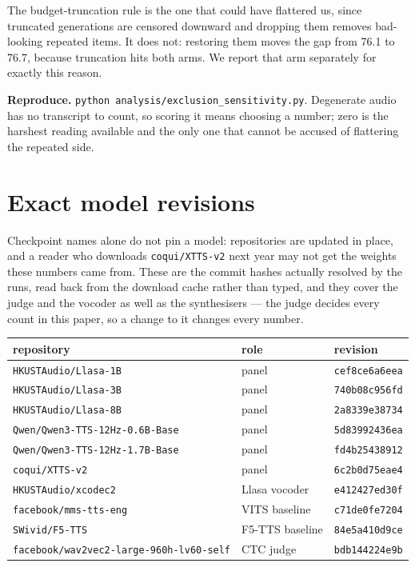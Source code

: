 \documentclass[11pt]{article}
\begin{document}
The budget-truncation rule is the one that could have flattered us, since
truncated generations are censored downward and dropping them removes bad-looking
repeated items. It does not: restoring them moves the gap from 76.1 to 76.7,
because truncation hits both arms. We report that arm separately for exactly this
reason.

\noindent\textbf{Reproduce.} \texttt{python analysis/exclusion\_sensitivity.py}.
Degenerate audio has no transcript to count, so scoring it means choosing a
number; zero is the harshest reading available and the only one that cannot be
accused of flattering the repeated side.


\section{Exact model revisions}

Checkpoint names alone do not pin a model: repositories are updated in place, and
a reader who downloads \texttt{coqui/XTTS-v2} next year may not get the weights
these numbers came from. These are the commit hashes actually resolved by the
runs, read back from the download cache rather than typed, and they cover the
judge and the vocoder as well as the synthesisers --- the judge decides every
count in this paper, so a change to it changes every number.

\begin{center}
\begin{tabular}{lll}
\toprule
repository & role & revision \\
\midrule
\texttt{HKUSTAudio/Llasa-1B} & panel & \texttt{cef8ce6a6eea} \\
\texttt{HKUSTAudio/Llasa-3B} & panel & \texttt{740b08c956fd} \\
\texttt{HKUSTAudio/Llasa-8B} & panel & \texttt{2a8339e38734} \\
\texttt{Qwen/Qwen3-TTS-12Hz-0.6B-Base} & panel & \texttt{5d83992436ea} \\
\texttt{Qwen/Qwen3-TTS-12Hz-1.7B-Base} & panel & \texttt{fd4b25438912} \\
\texttt{coqui/XTTS-v2} & panel & \texttt{6c2b0d75eae4} \\
\texttt{HKUSTAudio/xcodec2} & Llasa vocoder & \texttt{e412427ed30f} \\
\texttt{facebook/mms-tts-eng} & VITS baseline & \texttt{c71de0fe7204} \\
\texttt{SWivid/F5-TTS} & F5-TTS baseline & \texttt{84e5a410d9ce} \\
\texttt{facebook/wav2vec2-large-960h-lv60-self} & CTC judge & \texttt{bdb144224e9b} \\
\bottomrule
\end{tabular}
\end{center}
\end{document}
